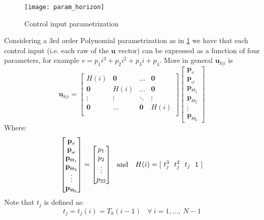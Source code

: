 \begin{figure}[h!]
	\centering
	\texttt{[image: param\_horizon]}
	\caption{Control input parametrization}
	\label{param_horizon}
\end{figure}
Considering a 3rd order Polynomial parametrization as in \ref{param_horizon} we have that each control input (i.e. each raw of the $\textbf{u}$ vector) can be expressed as a function of four parameters, for example $v=p_1i^3+p_2i^2+p_3i+p_4$.
More in general $\textbf{u}_{k|i}$ is
\begin{equation}
\textbf{u}_{k|i}=\left[ \begin{matrix}
H(i)          & \textbf{0} & \dots      & \textbf{0}  \\
\textbf{0} &     H(i)      & \dots      & \textbf{0}  \\
\vdots     & \vdots     & \ddots     & \vdots      \\
\textbf{0} & \dots      & \textbf{0} &   H(i)         \\
\end{matrix} \right] \left[ \begin{matrix} \textbf{p}_v \\ \textbf{p}_{\omega} \\ \textbf{p}_{\Theta_1} \\ \textbf{p}_{\Theta_2} \\ \vdots \\ \textbf{p}_{\Theta_6} \end{matrix} \right]
\end{equation}
Where: 
\begin{equation}
\left[ \begin{matrix} \textbf{p}_v \\ \textbf{p}_{\omega} \\ \textbf{p}_{\Theta_1} \\ \textbf{p}_{\Theta_2} \\ \vdots \\ \textbf{p}_{\Theta_6} \end{matrix} \right] = \left[ \begin{matrix} p_1 \\ p_2 \\ \vdots \\ p_{32} \end{matrix} \right]\ \ \textnormal{and }\ \ H(i)=[\ t_j^3\ \ t_j^2\ \ t_j\ \ 1\ ]
\end{equation}
Note that $t_j$  is defined as:
\begin{equation*}
	t_j=t_j(i)=T_k(i-1)\ \ \ \ \forall\ i=1,\dots,\ N-1
\end{equation*}
